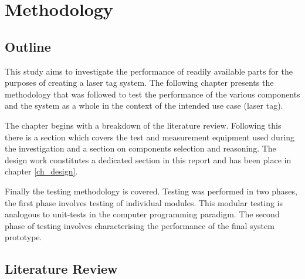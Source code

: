 \chapter{Methodology}






\section{Outline}

This study aims to investigate the performance of readily available parts for the purposes of creating a laser tag system. The following chapter presents the methodology that was followed to test the performance of the various components and the system as a whole in the context of the intended use case (laser tag).

The chapter begins with a breakdown of the literature review. Following this there is a section which covers the test and measurement equipment used during the investigation and a section on components selection and reasoning. The design work constitutes a dedicated section in this report and has been place in chapter \ref{ch_design}.

Finally the testing methodology is covered. Testing was performed in two phases, the first phase involves testing of individual modules. This modular testing is analogous to unit-tests in the computer programming paradigm. The second phase of testing involves characterising the performance of the final system prototype.

\section{Literature Review}


